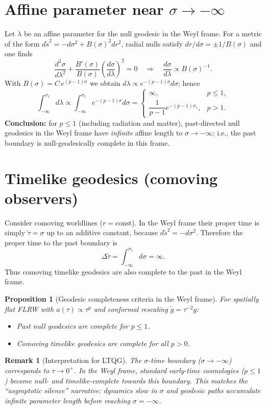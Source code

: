 \documentclass[11pt]{article}
\newtheorem{prop}{Proposition}
\newtheorem{remark}{Remark}
\begin{document}
\section*{Affine parameter near $\sigma\to -\infty$}
Let $\lambda$ be an affine parameter for the null geodesic in the Weyl frame.
For a metric of the form $d\tilde s^2 = -d\sigma^2 + B(\sigma)^2 dr^2$, radial nulls satisfy $d r/d\sigma = \pm 1/B(\sigma)$ and one finds
\begin{equation}
 \frac{d^2\sigma}{d\lambda^2} + \frac{B'(\sigma)}{B(\sigma)} \left(\frac{d\sigma}{d\lambda}\right)^2 = 0
 \quad\Rightarrow\quad
 \frac{d\sigma}{d\lambda} \propto B(\sigma)^{-1}.
\end{equation}
With $B(\sigma)=C\,e^{(p-1)\sigma}$ we obtain $d\lambda \propto e^{-(p-1)\sigma} d\sigma$; hence
\begin{equation}
 \int_{-\infty}^{\sigma_1} d\lambda \propto \int_{-\infty}^{\sigma_1} e^{-(p-1)\sigma} d\sigma =
 \begin{cases}
  \infty, & p\le 1,\\[4pt]
  \dfrac{1}{p-1} e^{-(p-1)\sigma_1}, & p>1.
 \end{cases}
\end{equation}
\textbf{Conclusion:} for $p\le 1$ (including radiation and matter), past-directed null geodesics in the Weyl frame have \emph{infinite} affine length to $\sigma\to -\infty$; i.e., the past boundary is null-geodesically complete in this frame.

\section*{Timelike geodesics (comoving observers)}
Consider comoving worldlines ($r=\text{const}$). In the Weyl frame their proper time is simply $\tilde{\tau}=\sigma$ up to an additive constant, because $d\tilde s^2=-d\sigma^2$.
Therefore the proper time to the past boundary is
\begin{equation}
 \Delta \tilde{\tau} = \int_{-\infty}^{\sigma_1} d\sigma = \infty.
\end{equation}
Thus comoving timelike geodesics are also complete to the past in the Weyl frame.

\begin{prop}[Geodesic completeness criteria in the Weyl frame]
For spatially flat FLRW with $a(\tau)\propto \tau^p$ and conformal rescaling $\tilde g=\tau^{-2} g$:
\begin{itemize}
 \item Past null geodesics are complete for $p\le 1$.
 \item Comoving timelike geodesics are complete for all $p>0$.
\end{itemize}
\end{prop}

\begin{remark}[Interpretation for LTQG]
The $\sigma$-time boundary ($\sigma\to -\infty$) corresponds to $\tau\to 0^+$.
In the Weyl frame, standard early-time cosmologies ($p\le 1$) become null- and timelike-complete towards this boundary.
This matches the ``asymptotic silence'' narrative: dynamics \emph{slow} in $\sigma$ and geodesic paths accumulate infinite parameter length before reaching $\sigma=-\infty$.
\end{remark}
\end{document}
